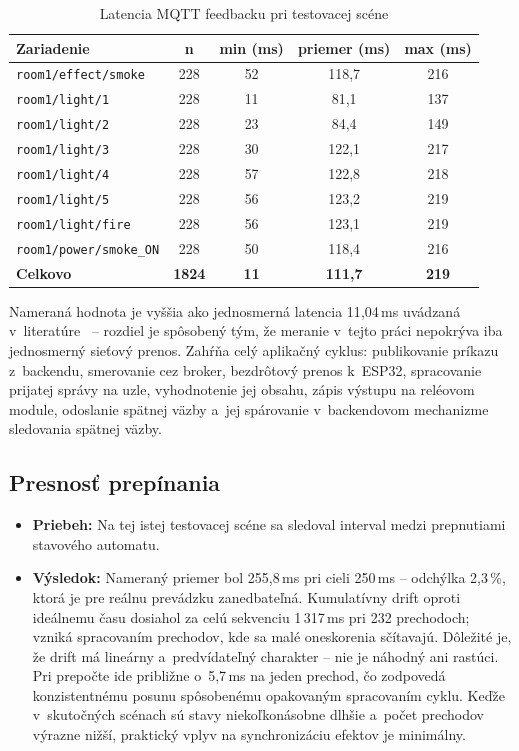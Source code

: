 \begin{table}[H]
\centering
\caption{Latencia MQTT feedbacku pri testovacej scéne}
\label{tab:latencia_feedback}
\begin{tabular}{|l|c|c|c|c|}
\hline
\textbf{Zariadenie} & \textbf{n} & \textbf{min (ms)} & \textbf{priemer (ms)} & \textbf{max (ms)} \\
\hline
\texttt{room1/effect/smoke} & 228 & 52 & 118{,}7 & 216 \\
\texttt{room1/light/1} & 228 & 11 & 81{,}1 & 137 \\
\texttt{room1/light/2} & 228 & 23 & 84{,}4 & 149 \\
\texttt{room1/light/3} & 228 & 30 & 122{,}1 & 217 \\
\texttt{room1/light/4} & 228 & 57 & 122{,}8 & 218 \\
\texttt{room1/light/5} & 228 & 56 & 123{,}2 & 219 \\
\texttt{room1/light/fire} & 228 & 56 & 123{,}1 & 219 \\
\texttt{room1/power/smoke\_ON} & 228 & 50 & 118{,}4 & 216 \\
\hline
\textbf{Celkovo} & \textbf{1824} & \textbf{11} & \textbf{111{,}7} & \textbf{219} \\
\hline
\end{tabular}
\end{table}

Nameraná hodnota je vyššia ako jednosmerná latencia 11{,}04\,ms uvádzaná
v~literatúre~\cite{mqtt_websocket_comparison} -- rozdiel je spôsobený tým,
že meranie v~tejto práci nepokrýva iba jednosmerný sieťový prenos.
Zahŕňa celý aplikačný cyklus: publikovanie príkazu z~backendu,
smerovanie cez broker, bezdrôtový prenos k~ESP32, spracovanie prijatej
správy na uzle, vyhodnotenie jej obsahu, zápis výstupu na reléovom module,
odoslanie spätnej väzby a~jej spárovanie v~backendovom mechanizme
sledovania spätnej väzby.

\subsection{Presnosť prepínania}
\begin{itemize}
    \item \textbf{Priebeh:} Na tej istej testovacej scéne sa sledoval interval medzi prepnutiami stavového automatu.
    \item \textbf{Výsledok:} Nameraný priemer bol 255{,}8\,ms pri cieli 250\,ms -- odchýlka 2,3\,\%,
        ktorá je pre reálnu prevádzku zanedbateľná. Kumulatívny drift oproti ideálnemu času dosiahol
        za celú sekvenciu 1\,317\,ms pri 232 prechodoch; vzniká spracovaním prechodov, kde sa malé oneskorenia
        sčítavajú. Dôležité je, že drift má lineárny a~predvídateľný charakter -- nie je náhodný ani
        rastúci. Pri prepočte ide približne o~5{,}7\,ms na jeden prechod, čo zodpovedá
        konzistentnému posunu spôsobenému opakovaným spracovaním cyklu. Keďže v~skutočných scénach sú stavy niekoľkonásobne dlhšie a~počet prechodov výrazne
        nižší, praktický vplyv na synchronizáciu efektov je minimálny.
\end{itemize}

